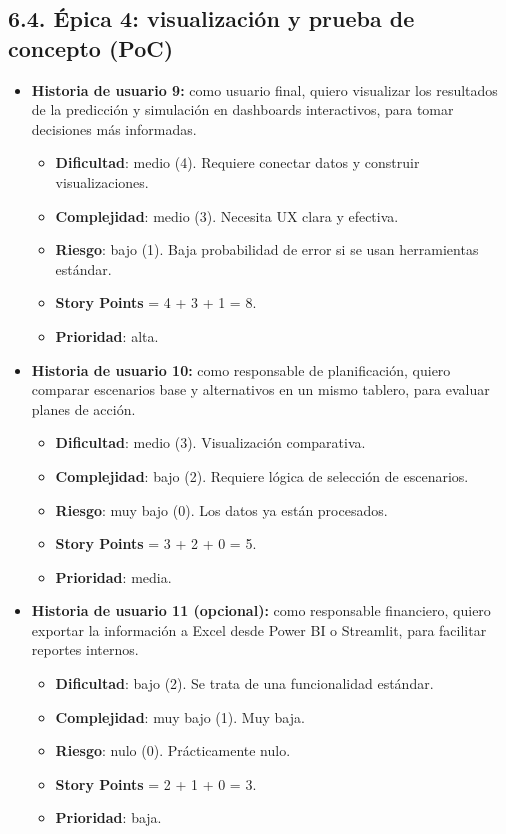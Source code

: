 \documentclass[
11pt, %
]{charter}
\begin{document}
\subsection*{6.4. Épica 4: visualización y prueba de concepto (PoC)}
\begin{itemize}
  \item \textbf{Historia de usuario 9:} como usuario final, quiero visualizar los resultados de la predicción y simulación en dashboards interactivos, para tomar decisiones más informadas.
    \begin{itemize}
      \item \textbf{Dificultad}: medio (4). Requiere conectar datos y construir visualizaciones.
      \item \textbf{Complejidad}: medio (3). Necesita UX clara y efectiva.
      \item \textbf{Riesgo}: bajo (1). Baja probabilidad de error si se usan herramientas estándar.
      \item \textbf{Story Points} = 4 + 3 + 1 = 8.
      \item \textbf{Prioridad}: alta.
    \end{itemize}
  \item \textbf{Historia de usuario 10:} como responsable de planificación, quiero comparar escenarios base y alternativos en un mismo tablero, para evaluar planes de acción.
    \begin{itemize}
      \item \textbf{Dificultad}: medio (3). Visualización comparativa.
      \item \textbf{Complejidad}: bajo (2). Requiere lógica de selección de escenarios.
      \item \textbf{Riesgo}: muy bajo (0). Los datos ya están procesados.
      \item \textbf{Story Points} = 3 + 2 + 0 = 5.
      \item \textbf{Prioridad}: media.
    \end{itemize}
  \item \textbf{Historia de usuario 11 (opcional):} como responsable financiero, quiero exportar la información a Excel desde Power BI o Streamlit, para facilitar reportes internos.
    \begin{itemize}
      \item \textbf{Dificultad}: bajo (2). Se trata de una funcionalidad estándar.
      \item \textbf{Complejidad}: muy bajo (1). Muy baja.
      \item \textbf{Riesgo}: nulo (0). Prácticamente nulo.
      \item \textbf{Story Points} = 2 + 1 + 0 = 3.
      \item \textbf{Prioridad}: baja.
    \end{itemize}
\end{itemize}
\end{document}
